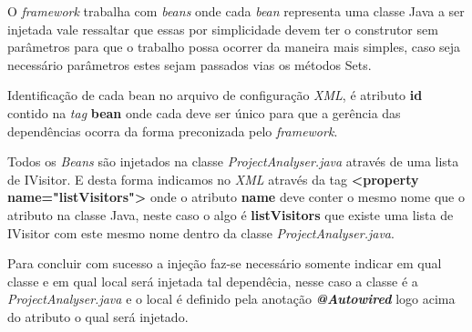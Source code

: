 %
%	


O {\it framework} trabalha com \textit{beans} onde cada \textit{bean} representa uma classe Java a ser injetada vale ressaltar que essas por simplicidade devem ter o construtor sem parâmetros para que o trabalho possa ocorrer da maneira mais simples, caso seja necessário parâmetros estes sejam passados vias os métodos Sets.

Identificação de cada bean no arquivo de configuração \textit{XML}, é atributo \textbf{id} contido na {\it tag} \textbf{bean} onde cada deve ser único para que a gerência das dependências ocorra da forma preconizada pelo {\it framework}.

Todos os {\it Beans} são injetados na classe \textit{ProjectAnalyser.java} através de uma lista de IVisitor. E desta forma indicamos no \textit{XML} através da tag \textbf{<property name="listVisitors">} onde o atributo \textbf{name} deve conter o mesmo nome que o atributo na classe Java,  neste caso o algo é \textbf{listVisitors} que existe uma lista de IVisitor com este mesmo nome dentro da classe \textit{ProjectAnalyser.java}.

Para concluir com sucesso a injeção faz-se necessário somente indicar em qual classe e em qual local será injetada tal dependêcia, nesse caso a classe é a \textit{ProjectAnalyser.java} e o local é definido pela anotação \textbf{\textit{@Autowired}} logo acima do atributo o qual será injetado.


